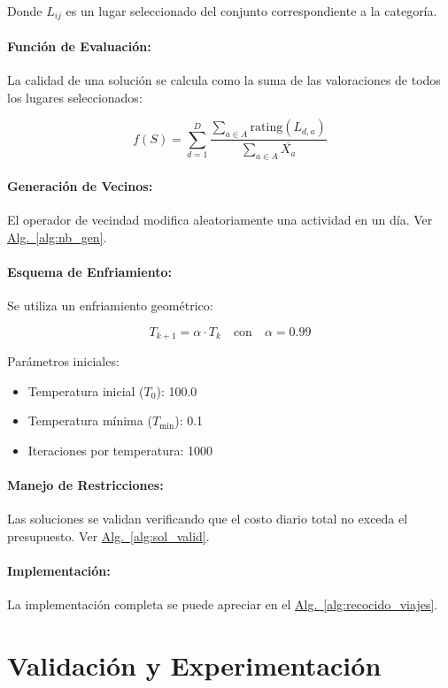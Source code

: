 \documentclass[10pt]{llncs}
\newcommand{\AlgRef}[1]{\hyperref[#1]{Alg.~\ref{#1}}}
\begin{document}
Donde $L_{ij}$ es un lugar seleccionado del conjunto correspondiente a la categoría.

\paragraph{Función de Evaluación:}
La calidad de una solución se calcula como la suma de las valoraciones de todos los lugares seleccionados:

\[
f(S) = \sum_{d=1}^{D} \dfrac{\sum_{a \in A} \text{rating}(L_{d,a})}{\sum_{a \in A} \overline{X_a}}
\]

\paragraph{Generación de Vecinos:}
El operador de vecindad modifica aleatoriamente una actividad en un día. Ver \AlgRef{alg:nb_gen}.

\paragraph{Esquema de Enfriamiento:}
Se utiliza un enfriamiento geométrico:

\[
T_{k+1} = \alpha \cdot T_k \quad \text{con} \quad \alpha = 0.99
\]

Parámetros iniciales:
\begin{itemize}
    \item Temperatura inicial ($T_0$): 100.0
    \item Temperatura mínima ($T_{\min}$): 0.1
    \item Iteraciones por temperatura: 1000
\end{itemize}

\paragraph{Manejo de Restricciones:}
Las soluciones se validan verificando que el costo diario total no exceda el presupuesto. Ver \AlgRef{alg:sol_valid}.

\paragraph{Implementación:}
La implementación completa se puede apreciar en el \AlgRef{alg:recocido_viajes}.


\vspace{\baselineskip}
\section{Validación y Experimentación}
\end{document}
